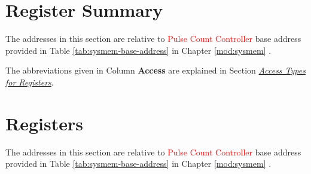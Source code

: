 \documentclass[main\_\_EN.tex]{subfiles}
\begin{document}



\newpage
\hypertarget{pcnt-reg-summ}{}
\section{Register Summary}
\label{sec:pcnt-reg-summ}

The addresses in this section are relative to \textcolor{red}{Pulse Count Controller} base address provided in Table \ref{tab:sysmem-base-address} in Chapter \ref{mod:sysmem} \textit{}.

The abbreviations given in Column \textbf{Access} are explained in Section \hyperref[glossary-access-types]{\textit{Access Types for Registers}}.






\newpage
\section{Registers}

The addresses in this section are relative to \textcolor{red}{Pulse Count Controller} base address provided in Table \ref{tab:sysmem-base-address} in Chapter \ref{mod:sysmem} \textit{}.


\end{document}
